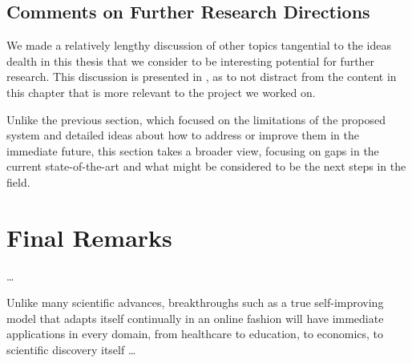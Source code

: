 \documentclass[../main.tex]{subfiles}
\begin{document}


    \subsection{Comments on Further Research Directions} \label{conclusions:research_directions}

    We made a relatively lengthy discussion of other topics tangential to the ideas dealth in this thesis that we consider to be interesting potential for further research. This discussion is presented in , as to not distract from the content in this chapter that is more relevant to the project we worked on. 

    Unlike the previous section, which focused on the limitations of the proposed system and detailed ideas about how to address or improve them in the immediate future, this section takes a broader view, focusing on gaps in the current state-of-the-art and what might be considered to be the next steps in the field.
    

    \section{Final Remarks} \label{conclusions:final_remarks} 
    
    \dots

    Unlike many scientific advances, breakthroughs such as a true self-improving model that adapts itself continually in an online fashion will have immediate applications in every domain, from healthcare to education, to economics, to scientific discovery itself \dots 

\end{document}
